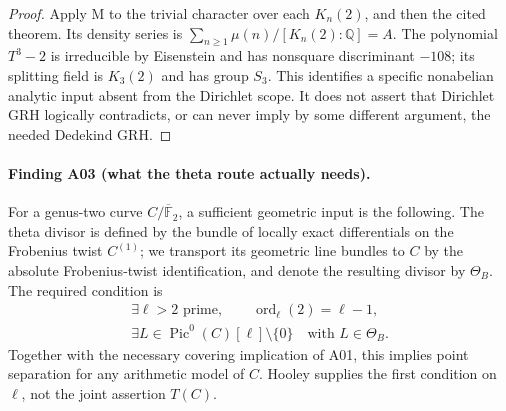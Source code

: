 \begin{proof}
Apply M to the trivial character over each $K_n(2)$, and then the
cited theorem. Its density series is
$\sum_{n\ge1}\mu(n)/[K_n(2):\mathbb Q]=A$. The polynomial $T^3-2$
is irreducible by Eisenstein and has nonsquare discriminant $-108$;
its splitting field is $K_3(2)$ and has group $S_3$. This identifies
a specific nonabelian analytic input absent from the Dirichlet scope.
It does not assert that Dirichlet GRH logically contradicts, or can
never imply by some different argument, the needed Dedekind GRH.
\end{proof}

\paragraph{Finding A03 (what the theta route actually needs).}
For a genus-two curve $C/\overline{\mathbb F}_2$, a sufficient geometric
input is the following. The theta divisor is defined by the bundle of
locally exact differentials on the Frobenius twist $C^{(1)}$; we
transport its geometric line bundles to $C$ by the absolute
Frobenius-twist identification, and denote the resulting divisor by
$\Theta_B$. The required condition is
\[
 \begin{gathered}
 \exists\ell>2\text{ prime},\qquad \operatorname{ord}_{\ell}(2)=\ell-1,\\
 \exists L\in\operatorname{Pic}^0(C)[\ell]\setminus\{0\}
                  \quad\text{with }L\in\Theta_B.
 \end{gathered}
 \tag{T(C)}
\]
Together with the necessary covering implication of A01, this implies
point separation for any arithmetic model of $C$. Hooley supplies the
first condition on $\ell$, not the joint assertion $T(C)$.

